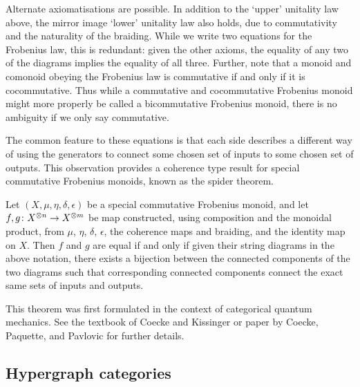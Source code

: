 Alternate axiomatisations are possible. In addition to the `upper' unitality law
above, the mirror image `lower' unitality law also holds, due to commutativity
and the naturality of the braiding. While we write two equations for the
Frobenius law, this is redundant: given the other axioms, the equality of any
two of the diagrams implies the equality of all three.  Further, note that a
monoid and comonoid obeying the Frobenius law is commutative if and only if it
is cocommutative. Thus while a commutative and cocommutative Frobenius monoid
might more properly be called a bicommutative Frobenius monoid, there is no
ambiguity if we only say commutative.

The common feature to these equations is that each side describes a different
way of using the generators to connect some chosen set of inputs to some chosen
set of outputs. This observation provides a coherence type result for special
commutative Frobenius monoids, known as the spider theorem.
\begin{theorem}
  Let $(X,\mu,\eta,\delta,\epsilon)$ be a special commutative Frobenius monoid,
  and let $f,g{\colon} X^{\otimes n} \to X^{\otimes m}$ be map constructed, using
  composition and the monoidal product, from $\mu$, $\eta$, $\delta$, $\epsilon$, the
  coherence maps and braiding, and the identity map on $X$. Then $f$ and $g$ are
  equal if and only if given their string diagrams in the above notation, there
  exists a bijection between the connected components of the two diagrams such
  that corresponding connected components connect the exact same sets of inputs
  and outputs.
\end{theorem}%
This theorem was first formulated in the context of categorical quantum
mechanics. See the textbook of Coecke and Kissinger \cite{CK} or paper by
Coecke, Paquette, and Pavlovic \cite{CPP} for further details.

\subsection{Hypergraph categories}

